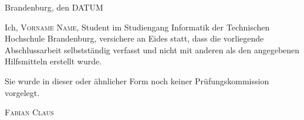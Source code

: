 \thispagestyle{empty}

\large
\begin{flushright}
  Brandenburg, den DATUM
\end{flushright}

\vspace*{50mm}
Ich, {\scshape Vorname Name}, Student im Studiengang Informatik der
Technischen Hochschule Brandenburg, versichere an Eides statt, dass die vorliegende
Abschlussarbeit selbstständig verfasst und nicht mit anderen als den
angegebenen Hilfsmitteln erstellt wurde.

Sie wurde in dieser oder ähnlicher Form noch keiner Prüfungskommission
vorgelegt.\\

\vspace*{50mm}

\begin{flushright}
  {\scshape Fabian Claus}
\end{flushright}

\normalsize
